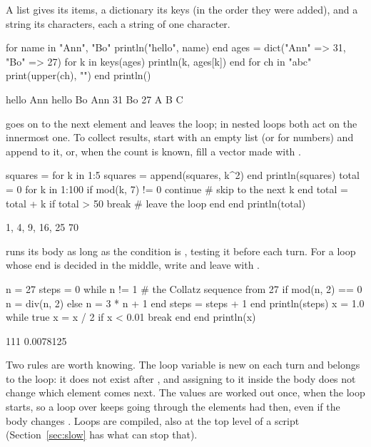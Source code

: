 \documentclass[11pt,a4paper,openany]{report}
\begin{document}
{{A list gives its items, a dictionary its keys (in the order they were
added), and a string its characters, each a string of one character.

\begin{axon}
for name in {"Ann", "Bo"}
  println("hello", name)
end
ages = dict("Ann" => 31, "Bo" => 27)
for k in keys(ages)
  println(k, ages[k])
end
for ch in "abc"
  print(upper(ch), "")
end
println()
\end{axon}
\begin{axonout}
hello Ann
hello Bo
Ann 31
Bo 27
A B C
\end{axonout}

 goes on to the next element and  leaves the
loop; in nested loops both act on the innermost one. To collect results,
start with an empty list (or  for numbers) and append to it,
or, when the count is known, fill a vector made with .

\begin{axon}
squares = {}
for k in 1:5
  squares = append(squares, k^2)
end
println(squares)
total = 0
for k in 1:100
  if mod(k, 7) != 0
    continue             # skip to the next k
  end
  total = total + k
  if total > 50
    break                # leave the loop
  end
end
println(total)
\end{axon}
\begin{axonout}
{1, 4, 9, 16, 25}
70
\end{axonout}

 runs its body as long as the condition is
, testing it before each turn. For a loop whose end is decided in
the middle, write  and leave with .

\begin{axon}
n = 27
steps = 0
while n != 1             # the Collatz sequence from 27
  if mod(n, 2) == 0
    n = div(n, 2)
  else
    n = 3 * n + 1
  end
  steps = steps + 1
end
println(steps)
x = 1.0
while true
  x = x / 2
  if x < 0.01
    break
  end
end
println(x)
\end{axon}
\begin{axonout}
111
0.0078125
\end{axonout}

Two rules are worth knowing. The loop variable is new on each turn and belongs
to the loop: it does not exist after , and assigning to it inside the
body does not change which element comes next. The values are worked out once,
when the loop starts, so a loop over  keeps going through the elements
 had then, even if the body changes . Loops are compiled, also
at the top level of a script (Section~\ref{sec:slow} has what can stop that).

}}
\end{document}
